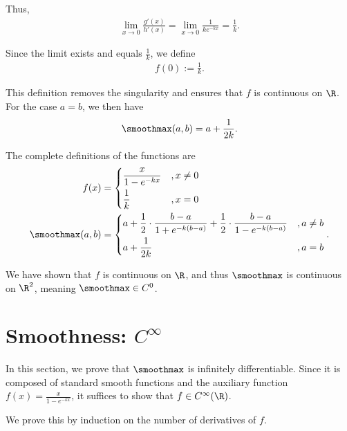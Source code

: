 Thus,
\begin{align}
    \lim_{x \to 0} \frac{g'(x)}{h'(x)} = \lim_{x \to 0} \frac{1}{k e^{-kx}} = \frac{1}{k}.
\end{align}

Since the limit exists and equals $\frac{1}{k}$, we define
\begin{align}
    f(0) := \frac{1}{k}.
\end{align}

This definition removes the singularity and ensures that $f$ is continuous on $\R$. For the case $a = b$, we then have
\begin{align}
    \smoothmax(a, b) = a + \frac{1}{2k}.
\end{align}

The complete definitions of the functions are
\begin{align}
    f(x) &= \begin{dcases}
        \frac{x}{1 - e^{-kx}} &, x \neq 0 \\
        \frac{1}{k} &, x = 0
    \end{dcases} \\
    \smoothmax(a, b) &= \begin{dcases}
        a + \frac{1}{2} \cdot \frac{b - a}{1 + e^{-k(b - a)}} + \frac{1}{2} \cdot \frac{b - a}{1 - e^{-k(b - a)}} &, a \neq b \\
        a + \frac{1}{2k} &, a = b
    \end{dcases}.
\end{align}

We have shown that $f$ is continuous on $\R$, and thus $\smoothmax$ is continuous on $\R^2$, meaning $\smoothmax \in C^0$.
\section{Smoothness: $C^\infty$}

In this section, we prove that $\smoothmax$ is infinitely differentiable. Since it is composed of standard smooth functions and the auxiliary function $f(x) = \frac{x}{1 - e^{-kx}}$, it suffices to show that $f \in C^\infty(\R)$.

We prove this by induction on the number of derivatives of $f$.

